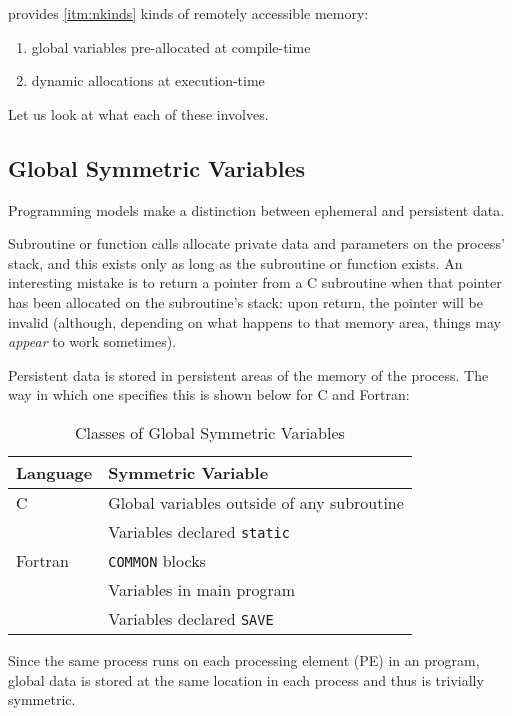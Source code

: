 \openshmem provides \ref{itm:nkinds} kinds of remotely accessible memory:

\begin{enumerate}
  \item global variables pre-allocated at compile-time
  \item \label{itm:nkinds} dynamic allocations at execution-time
\end{enumerate}

Let us look at what each of these involves.

\subsection{Global Symmetric Variables}

Programming models make a distinction between ephemeral and persistent
data.

Subroutine or function calls allocate private data and parameters on
the process' stack, and this exists only as long as the subroutine or
function exists.  An interesting mistake is to return a pointer from a
C subroutine when that pointer has been allocated on the subroutine's
stack: upon return, the pointer will be invalid (although, depending
on what happens to that memory area, things may \emph{appear} to work
sometimes).

Persistent data is stored in persistent areas of the memory of the
process.  The way in which one specifies this is shown below for C and
Fortran:

\vspace{0.2in}
\begin{table}[h]
  \begin{center}
    \caption{Classes of Global Symmetric Variables}
    \begin{tabular}{|p{}|p{}|}
      \hline 
      Language & Symmetric Variable \tabularnewline
      \hline
      \hline 
      C & Global variables outside of any subroutine \tabularnewline
        & Variables declared \texttt{static} \tabularnewline
      \hline 
      Fortran & \texttt{COMMON} blocks \tabularnewline
              & Variables in main program \tabularnewline
              & Variables declared \texttt{SAVE} \tabularnewline
      \hline 
    \end{tabular}
  \end{center}
\end{table}
\vspace{0.2in}

Since the same process runs on each processing element (PE) in an
\openshmem program, global data is stored at the same location in each
process and thus is trivially symmetric.

